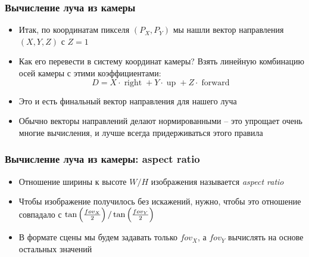 \documentclass[10pt]{beamer}
\begin{document}
\begin{frame}
\frametitle{Вычисление луча из камеры}
\begin{itemize}
\item Итак, по координатам пикселя \begin{math}(P_X, P_Y)\end{math} мы нашли вектор направления \begin{math}(X, Y, Z)\end{math} с \begin{math}Z=1\end{math}
\pause
\item Как его перевести в систему координат камеры? \pause Взять линейную комбинацию осей камеры с этими коэффициентами:
\begin{equation}
D = X\cdot\operatorname{right}+Y\cdot\operatorname{up}+Z\cdot\operatorname{forward}
\end{equation}
\pause
\item Это и есть финальный вектор направления для нашего луча
\pause
\item Обычно векторы направлений делают нормированными -- это упрощает очень многие вычисления, и лучше всегда придерживаться этого правила
\end{itemize}
\end{frame}

\begin{frame}
\frametitle{Вычисление луча из камеры: aspect ratio}
\begin{itemize}
\item Отношение ширины к высоте \begin{math}W / H\end{math} изображения называется \textit{aspect ratio}
\pause
\item Чтобы изображение получилось без искажений, нужно, чтобы это отношение совпадало с \begin{math}\tan\left({fov_X\over 2}\right) / \tan\left({fov_Y\over 2}\right)\end{math}
\pause
\item В формате сцены мы будем задавать только \begin{math}fov_X\end{math}, а \begin{math}fov_Y\end{math} вычислять на основе остальных значений
\end{itemize}
\end{frame}
\end{document}
